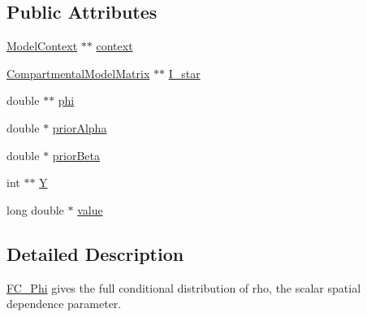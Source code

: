\subsection*{Public Attributes}
\begin{DoxyCompactItemize}
\item 
\hyperlink{classSpatialSEIR_1_1ModelContext}{Model\-Context} $\ast$$\ast$ \hyperlink{classSpatialSEIR_1_1FC__Phi_ad6a811039932fb9d393950d51e2a66d5}{context}
\item 
\hyperlink{classSpatialSEIR_1_1CompartmentalModelMatrix}{Compartmental\-Model\-Matrix} $\ast$$\ast$ \hyperlink{classSpatialSEIR_1_1FC__Phi_a5b07b79b34c5c6e2c81748b4fd8c0961}{I\-\_\-star}
\item 
double $\ast$$\ast$ \hyperlink{classSpatialSEIR_1_1FC__Phi_a40287a4878b59620961c279a8cb31672}{phi}
\item 
double $\ast$ \hyperlink{classSpatialSEIR_1_1FC__Phi_a416262207b7dff48d89e16fd31d7a41f}{prior\-Alpha}
\item 
double $\ast$ \hyperlink{classSpatialSEIR_1_1FC__Phi_ad65cf8a1b9bc7fc76e63bfe6d051dda6}{prior\-Beta}
\item 
int $\ast$$\ast$ \hyperlink{classSpatialSEIR_1_1FC__Phi_a74748c40d5729ec9bdacbc04f2294548}{Y}
\item 
long double $\ast$ \hyperlink{classSpatialSEIR_1_1FC__Phi_a649b11fba5f8820f83ced5a538f40fa3}{value}
\end{DoxyCompactItemize}


\subsection{Detailed Description}
\hyperlink{classSpatialSEIR_1_1FC__Phi}{F\-C\-\_\-\-Phi} gives the full conditional distribution of rho, the scalar spatial dependence parameter. 

